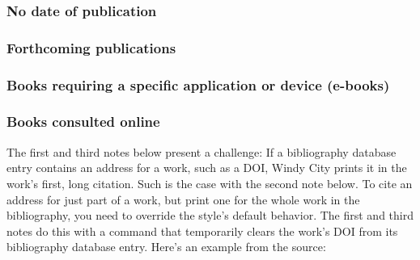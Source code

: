 \documentclass[11pt,letterpaper,oneside]{article}
\begin{document}
\begin{citebib}
\item \cite[329]{hayek2011}
\end{citebib}

\subsubsection{No date of publication}

\begin{citebib}
\item \cite{boston}
\item \cite{edinburgh1750}
\item \cite{edinburgh}
\end{citebib}

\subsubsection{Forthcoming publications}

\begin{citebib}
\item \cite{author}
\item \cite[345--46]{writer}
\item \cite{contributor}
\end{citebib}

\setcounter{subsubsection}{158}
\subsubsection{Books requiring a specific application or device (e-books)}

\begin{citebib}
\item \cite{borel2015}
\end{citebib}

\setcounter{subsubsection}{160}
\subsubsection{Books consulted online}

The first and third notes below present a challenge: If a bibliography
database entry contains an address for a work, such as a DOI, Windy
City prints it in the work's first, long citation. Such is the case
with the second note below. To cite an address for just part of a
work, but print one for the whole work in the bibliography, you need
to override the style's default behavior. The first and third notes do
this with a command that temporarily clears the work's DOI from its
bibliography database entry. Here's an example from the source:
\end{document}

